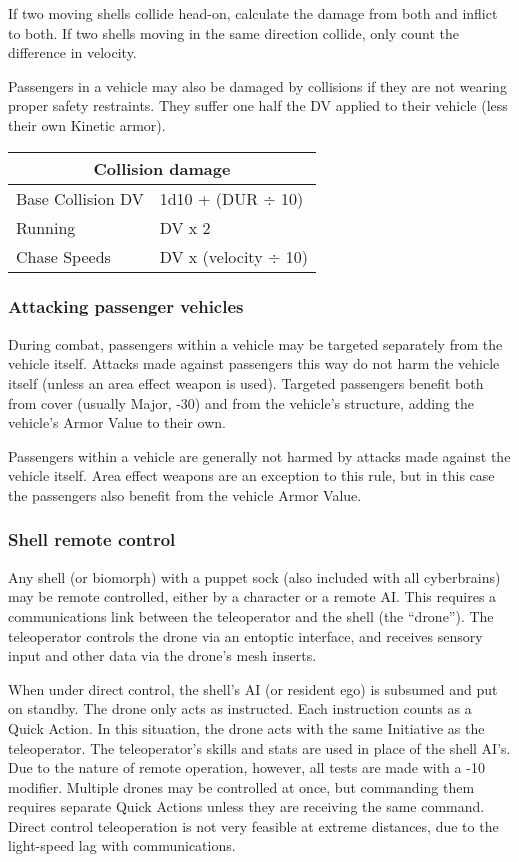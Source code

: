 If two moving shells collide head-on, calculate the damage from both and inflict to both. If two shells moving in the same direction collide, only count the difference in velocity.

Passengers in a vehicle may also be damaged by collisions if they are not wearing proper safety restraints. They suffer one half the DV applied to their vehicle (less their own Kinetic armor).


\begin{tabular}{|l|l|}
\hline
\multicolumn{2}{|c|}{\textbf{Collision damage}} \\
\hline
Base Collision DV & 1d10 + (DUR $\div$ 10) \\
\hline
Running & DV x 2 \\
\hline
Chase Speeds & DV x (velocity $\div$ 10) \\ \hline
\end{tabular}

\subsubsection{Attacking passenger vehicles}
During combat, passengers within a vehicle may be targeted separately from the vehicle itself. Attacks made against passengers this way do not harm the vehicle itself (unless an area effect weapon is used). Targeted passengers benefit both from cover (usually Major, -30) and from the vehicle’s structure, adding the vehicle’s Armor Value to their own.

Passengers within a vehicle are generally not harmed by attacks made against the vehicle itself. Area effect weapons are an exception to this rule, but in this case the passengers also benefit from the vehicle Armor Value.

\subsubsection{Shell remote control}
Any shell (or biomorph) with a puppet sock (also included with all cyberbrains) may be remote controlled, either by a character or a remote AI. This requires a communications link between the teleoperator and the shell (the ``drone”). The teleoperator controls the drone via an entoptic interface, and receives sensory input and other data via the drone’s mesh inserts.

When under direct control, the shell’s AI (or resident ego) is subsumed and put on standby. The drone only acts as instructed. Each instruction counts as a Quick Action. In this situation, the drone acts with the same Initiative as the teleoperator. The teleoperator’s skills and stats are used in place of the shell AI’s. Due to the nature of remote operation, however, all tests are made with a -10 modifier. Multiple drones may be controlled at once, but commanding them requires separate Quick Actions unless they are receiving the same command. Direct control teleoperation is not very feasible at extreme distances, due to the light-speed lag with communications.

